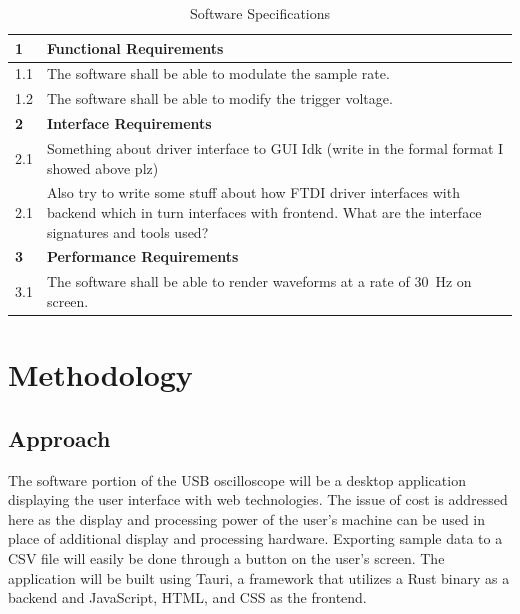 \documentclass[letterpaper,12pt]{article}
\begin{document}
\begin{table}[h!]
    \caption{Software Specifications}
    \begin{tabularx}{\textwidth}{l|l}
        \textbf{1} & \textbf{Functional Requirements}\\
        \hline
        1.1 & The software shall be able to modulate the sample rate. \\
        1.2 & The software shall be able to modify the trigger voltage. \\
        \hline
        \textbf{2} & \textbf{Interface Requirements} \\
        \hline
        2.1 & Something about driver interface to GUI Idk (write in the formal format I showed above plz) \\
        2.1 & Also try to write some stuff about how FTDI driver interfaces with backend which in turn interfaces with frontend. What are the interface signatures and tools used? \\
        \hline
        \textbf{3} & \textbf{Performance Requirements} \\
        \hline
        3.1 & The software shall be able to render waveforms at a rate of \SI{30}{\hertz} on screen.
    \end{tabularx} 
\label{sw:specs-table}
\end{table}


\section{Methodology} %

\subsection{Approach}

The software portion of the USB oscilloscope will be a desktop application
displaying the user interface with web technologies. The issue of cost is
addressed here as the display and processing power of the user's machine
can be used in place of additional display and processing hardware. Exporting
sample data to a CSV file will easily be done through a button on the user's
screen. The application will be built using Tauri, a framework that utilizes
a Rust binary as a backend and JavaScript, HTML, and CSS as the frontend.
\end{document}
